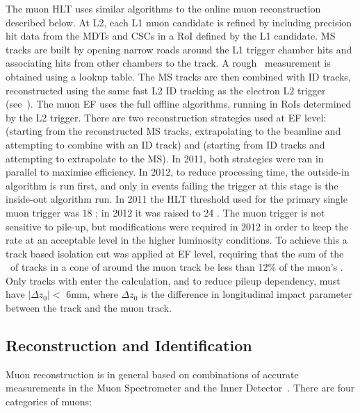 The muon HLT uses similar algorithms to the online muon reconstruction described
below. At L2, each L1 muon candidate is refined by including precision hit data
from the MDTs and CSCs in a RoI defined by the L1 candidate. MS tracks are
built by opening narrow roads around the L1 trigger chamber hits and associating
hits from other chambers to the track. A rough \pt\ measurement is obtained
using a lookup table. The MS tracks are then combined with ID tracks,
reconstructed using the same fast L2 ID tracking as the electron L2 trigger
(see~). The muon EF uses the full offline algorithms,
running in RoIs determined by the L2 trigger. There are two reconstruction
strategies used at EF level:  (starting from the reconstructed
MS tracks, extrapolating to the beamline and attempting to combine with an ID
track) and  (starting from ID tracks and attempting to
extrapolate to the MS). In 2011, both strategies were ran in parallel to
maximise efficiency. In 2012, to reduce processing time, the outside-in
algorithm is run first, and only in events failing the trigger at this stage is
the inside-out algorithm run. In 2011 the HLT threshold used for the primary
single muon trigger was 18 \GeV; in 2012 it was raised to 24 \GeV. The muon
trigger is not sensitive to pile-up, but modifications were required in 2012 in
order to keep the rate at an acceptable level in the higher luminosity
conditions. To achieve this a track based isolation cut was applied at EF level,
requiring that the sum of the \pt\ of tracks in a cone of  around
the muon track be less than 12\% of the muon's \pt. Only tracks with 
enter the calculation, and to reduce pileup dependency, must have $|\Delta
z_{0}| <$ 6mm, where $\Delta z_{0}$ is the difference in longitudinal impact
parameter between the track and the muon track.

\subsection{Reconstruction and Identification}
\label{sec:reco-mu-reco}

Muon reconstruction is in general based on combinations of accurate measurements
in the Muon Spectrometer and the Inner Detector~\cite{ATLAS-CONF-2010-064,ATLAS-CONF-2011-063}. There are four categories of
muons:


